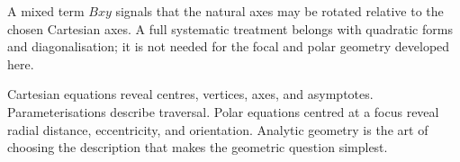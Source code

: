 A mixed term $Bxy$ signals that the natural axes may be rotated relative to the
chosen Cartesian axes. A full systematic treatment belongs with quadratic
forms and diagonalisation; it is not needed for the focal and polar geometry
developed here.

\begin{summarybox}
Cartesian equations reveal centres, vertices, axes, and asymptotes.
Parameterisations describe traversal. Polar equations centred at a focus reveal
radial distance, eccentricity, and orientation. Analytic geometry is the art of
choosing the description that makes the geometric question simplest.
\end{summarybox}